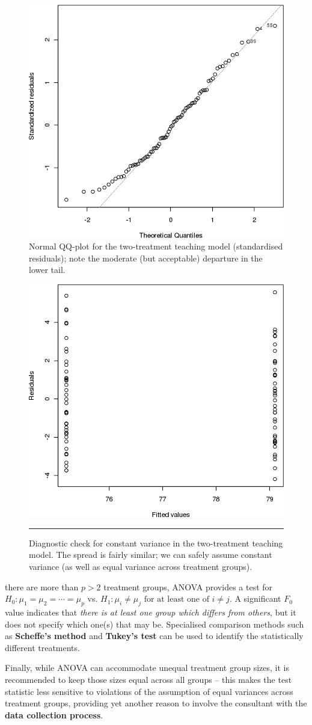 \begin{figure}[!t]
\centering
  \includegraphics[width=0.475\linewidth]{images/SA/testA3.png}
  \caption[\small Normal QQ-plot for the two-treatment teaching model]{\small Normal QQ-plot for the two-treatment teaching model (standardised residuals); note the moderate (but acceptable) departure in the lower tail.}
  \label{fig:testA3}
\end{figure}
\begin{figure}[!t]
\centering
  \includegraphics[width=0.475\linewidth]{images/SA/testA4.png}
  \caption[\small Diagnostic check for constant variance in the two-treatment teaching model]{\small Diagnostic check for constant variance in the two-treatment teaching model. The spread is fairly similar; we can safely assume constant variance (as well as equal variance across treatment groups).}
  \label{fig:testA4}\hrule
\end{figure}
 there are more than $p>2$ treatment groups, ANOVA provides a test for $H_{0}: \mu_{1} = \mu_{2} = \cdots = \mu_{p}$ vs. $H_{1}: \mu_{i} \neq \mu_{j} \text{ for at least one of } i \neq j$. A significant $F_0$ value indicates that \textit{there is at least one group which differs from others}, but it does not specify which one(s) that may be. Specialised comparison methods such as \textbf{Scheffe's method} and \textbf{Tukey's test} can be used to identify the statistically different treatments.\par Finally, while ANOVA can accommodate unequal treatment group sizes, it is recommended to keep those sizes equal across all groups -- this  makes the test statistic less sensitive to violations of the assumption of equal variances across treatment groups, providing yet another reason to involve the consultant with the \textbf{data collection process}.

